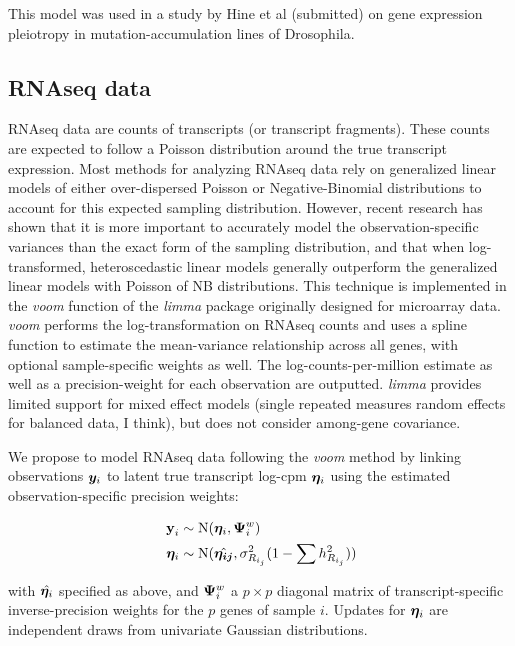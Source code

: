 \documentclass[11pt]{amsart}
\newcommand*{\B}[1]{\ifmmode\bm{#1}\else\textbf{#1}\fi}
\begin{document}
This model was used in a study by Hine et al (submitted) on gene expression pleiotropy in mutation-accumulation lines of Drosophila.

\subsection{RNAseq data}
RNAseq data are counts of transcripts (or transcript fragments). These counts are expected to follow a Poisson distribution around the true transcript expression. Most methods for analyzing RNAseq data rely on generalized linear models of either over-dispersed Poisson or Negative-Binomial distributions to account for this expected sampling distribution. However, recent research has shown that it is more important to accurately model the observation-specific variances than the exact form of the sampling distribution, and that when log-transformed, heteroscedastic linear models generally outperform the generalized linear models with Poisson of NB distributions. This technique is implemented in the \emph{voom} function of the \emph{limma} package originally designed for microarray data. \emph{voom} performs the log-transformation on RNAseq counts and uses a spline function to estimate the mean-variance relationship across all genes, with optional sample-specific weights as well. The log-counts-per-million estimate as well as a precision-weight for each observation are outputted. \emph{limma} provides limited support for mixed effect models (single repeated measures random effects for balanced data, I think), but does not consider among-gene covariance.

We propose to model RNAseq data following the \emph{voom} method by linking observations $\B{y}_i$ to latent true transcript log-cpm $\B{\eta}_i$ using the estimated observation-specific precision weights:

\begin{align} \begin{split}
\B{y}_i &\sim \mbox{N}(\B{\eta}_i, \B{\Psi}^w_i) \\
\;\B{\eta}_i &\sim \mbox{N}(\hat{\B{\eta_{ij}}},\sigma^2_{R_{i_j}}(1-\sum h^2_{R_{i_j}}))
\end{split}\end{align}

\noindent with $\hat{\B{\eta}_i}$ specified as above, and $\B{\Psi}^w_i$ a $p \times p$ diagonal matrix of transcript-specific inverse-precision weights for the $p$ genes of sample $i$. Updates for $\B{\eta}_i$ are independent draws from univariate Gaussian distributions.
\end{document}
